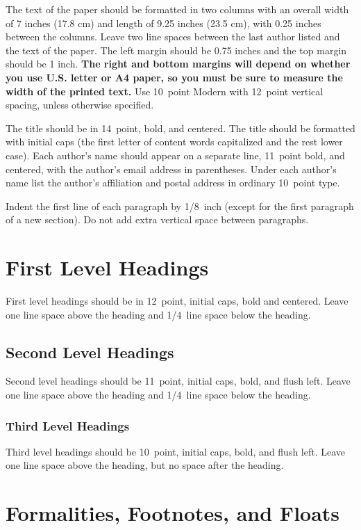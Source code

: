 \documentclass[10pt,letterpaper]{article}
\begin{document}
The text of the paper should be formatted in two columns with an
overall width of 7 inches (17.8 cm) and length of 9.25 inches (23.5
cm), with 0.25 inches between the columns. Leave two line spaces
between the last author listed and the text of the paper. The left
margin should be 0.75 inches and the top margin should be 1 inch.
\textbf{The right and bottom margins will depend on whether you use
  U.S. letter or A4 paper, so you must be sure to measure the width of
  the printed text.} Use 10~point Modern with 12~point vertical
spacing, unless otherwise specified.

The title should be in 14~point, bold, and centered. The title should
be formatted with initial caps (the first letter of content words
capitalized and the rest lower case). Each author's name should appear
on a separate line, 11~point bold, and centered, with the author's
email address in parentheses. Under each author's name list the
author's affiliation and postal address in ordinary 10~point type.

Indent the first line of each paragraph by 1/8~inch (except for the
first paragraph of a new section). Do not add extra vertical space
between paragraphs.


\section{First Level Headings}

First level headings should be in 12~point, initial caps, bold and
centered. Leave one line space above the heading and 1/4~line space
below the heading.


\subsection{Second Level Headings}

Second level headings should be 11~point, initial caps, bold, and
flush left. Leave one line space above the heading and 1/4~line
space below the heading.


\subsubsection{Third Level Headings}

Third level headings should be 10~point, initial caps, bold, and flush
left. Leave one line space above the heading, but no space after the
heading.


\section{Formalities, Footnotes, and Floats}
\end{document}
